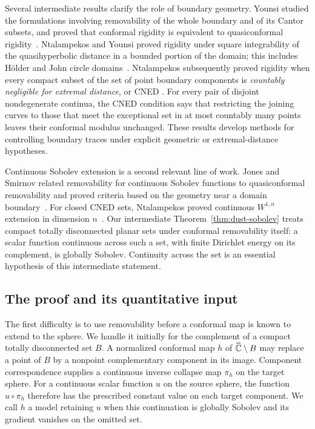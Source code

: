 Several intermediate results clarify the role of boundary geometry.
Younsi studied the formulations involving removability of the whole
boundary and of its Cantor subsets, and proved that conformal rigidity
is equivalent to quasiconformal rigidity~\cite[Theorems~3--5]{Younsi2016}.
Ntalampekos and Younsi proved rigidity under square integrability of the
quasihyperbolic distance in a bounded portion of the domain; this
includes H\"older and John circle domains~\cite[Theorem~1.6 and
Corollary~1.7]{NY2020}.  Ntalampekos subsequently proved rigidity when
every compact subset of the set of point boundary components is
\emph{countably negligible for extremal distance}, or CNED
\cite[Theorem~1.2]{Ntalampekos2023}.  For every pair of disjoint nondegenerate continua, the CNED condition
says that restricting the joining curves to those that meet the
exceptional set in at most countably many points leaves their conformal
modulus unchanged.  These results develop
methods for controlling boundary traces under explicit geometric or
extremal-distance hypotheses.

Continuous Sobolev extension is a second relevant line of work.
Jones and Smirnov related removability for continuous Sobolev functions
to quasiconformal removability and proved criteria based on the geometry
near a domain boundary~\cite[Definition~2 and Theorems~2,~4]{JonesSmirnov2000}.
For closed CNED sets, Ntalampekos proved continuous $W^{1,n}$ extension
in dimension $n$~\cite[Theorem~1.4]{NtalampekosCNED2024}.
Our intermediate Theorem~\ref{thm:dust-sobolev} treats compact totally
disconnected planar sets under conformal removability itself: a scalar
function continuous across such a set, with finite Dirichlet energy
on its complement, is globally Sobolev.  Continuity across the set is
an essential hypothesis of this intermediate statement.

\subsection{The proof and its quantitative input}

The first difficulty is to use removability before a conformal map is
known to extend to the sphere.  We handle it initially for the complement
of a compact totally disconnected set $B$.  A normalized conformal map
$h$ of $\widehat{\mathbb C}\setminus B$ may replace a point of $B$ by a nonpoint
complementary component in its image.  Component correspondence supplies
a continuous inverse collapse map $\pi_h$ on the target sphere.  For a
continuous scalar function $u$ on the source sphere, the function
$u\circ\pi_h$ therefore has the prescribed constant value on each target
component.  We call $h$ a model retaining $u$ when this continuation is
globally Sobolev and its gradient vanishes on the omitted set.

